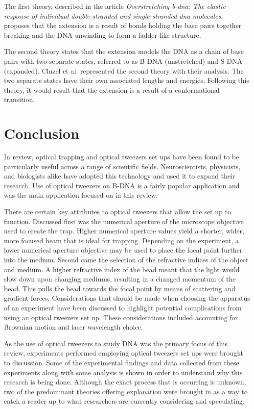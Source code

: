 \documentclass[%
 aip,
 amsmath,amssymb,
 reprint,%
]{revtex4-1}
\begin{document}
    The first theory, described in the article \textit{Overstretching b-dna: The elastic
    response of individual double-stranded and single-stranded dna molecules}\cite{overstretching}, proposes that the extension is a result of bonds holding the base pairs together breaking and the DNA unwinding to form a ladder like structure\cite{overstretching}. 

    The second theory states that the extension models the DNA as a chain of base pairs with two separate states, referred to as B-DNA (unstretched) and S-DNA (expanded). Cluzel et al.\cite{extensible} represented the second theory with their analysis. The two separate states have their own associated lengths and energies. Following this theory, it would result that the extension is a result of a conformational transition\cite{extensible}.

\section{Conclusion}
    In review, optical trapping and optical tweezers set ups have been found to be particularly useful across a range of scientific fields. Neuroscientists, physicists, and biologists alike have adopted this technology and used it to expand their research. Use of optical tweezers on B-DNA is a fairly popular application and was the main application focused on in this review. 
    
    There are certain key attributes to optical tweezers that allow the set up to function. Discussed first was the numerical aperture of the microscope objective used to create the trap. Higher numerical aperture values yield a shorter, wider, more focused beam that is ideal for trapping. Depending on the experiment, a lower numerical aperture objective may be used to place the focal point further into the medium. Second came the selection of the refractive indices of the object and medium. A higher refractive index of the bead meant that the light would slow down upon changing mediums, resulting in a changed momentum of the bead. This pulls the bead towards the focal point by means of scattering and gradient forces. Considerations that should be made when choosing the apparatus of an experiment have been discussed to highlight potential complications from using an optical tweezers set up. These considerations included accounting for Brownian motion and laser wavelength choice. 
    
    As the use of optical tweezers to study DNA was the primary focus of this review, experiments performed employing optical tweezers set ups were brought to discussion. Some of the experimental findings and data collected from these experiments along with some analysis is shown in order to understand why this research is being done. Although the exact process that is occurring is unknown, two of the predominant theories offering explanation were brought in as a way to catch a reader up to what researchers are currently considering and speculating.
    



\nocite{*}

\end{document}
